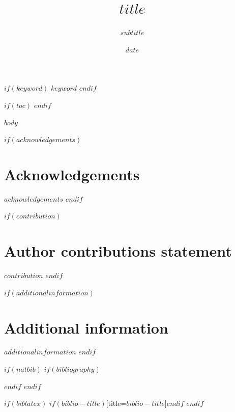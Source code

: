 \documentclass[$if(fontsize)$$fontsize$,$endif$$if(lang)$$lang$,$endif$$if(papersize)$$papersize$,$endif$$for(classoption)$$classoption$$sep$,$endfor$]{$documentclass$}
\author$if(author.footnote)$[$author.footnote$$if(author.corresponding)$,$$\ast$$ $endif$]$elseif(author.corresponding)$[$$*$$]$endif${$author.name$}
\affil[$affiliation.number$]{$affiliation.name$}
\affil[*]{$author.email$}
\date{$date$}
\title{$title$}
\subtitle{$subtitle$}
\begin{document}
\maketitle %


$if(keyword)$
$keyword$
$endif$


$if(toc)$
\setcounter{tocdepth}{$toc-depth$}
\tableofcontents
$endif$
 
  
$body$


$if(acknowledgements)$
\section*{Acknowledgements}
$acknowledgements$
$endif$

$if(contribution)$
\section*{Author contributions statement}
$contribution$
$endif$


$if(additionalinformation)$
\section*{Additional information}
$additionalinformation$
$endif$
 




 
$if(natbib)$
$if(bibliography)$
% 

$endif$
$endif$

$if(biblatex)$
\printbibliography$if(biblio-title)$[title=$biblio-title$]$endif$
$endif$






\end{document}
